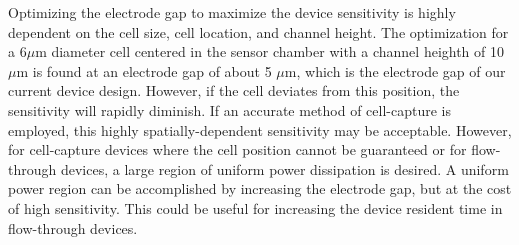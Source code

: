 \par Optimizing the electrode gap to maximize the device sensitivity is highly dependent on the cell size, cell location, and channel height. The optimization for a 6$\mu$m  diameter cell centered in the sensor chamber with a channel heighth of 10 $\mu$m is found at an electrode gap of about 5 $\mu$m, which is the electrode gap of our current device design. However, if the cell deviates from this position, the sensitivity will rapidly diminish. If an accurate method of cell-capture is employed, this highly spatially-dependent sensitivity may be acceptable. However, for cell-capture devices where the cell position cannot be guaranteed or for flow-through devices, a large region of uniform power dissipation is desired. A uniform power region can be accomplished by increasing the electrode gap, but at the cost of high sensitivity. This could be useful for increasing the device resident time in flow-through devices.



